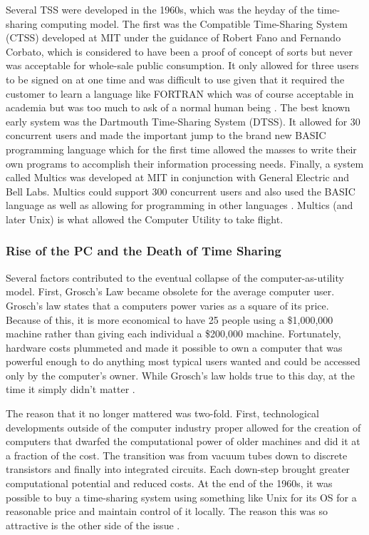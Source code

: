 \documentclass[12pt,oneside,letterpaper,titlepage]{article}
\begin{document}
Several TSS were developed in the 1960s, which was the heyday of the
time-sharing computing model.  The first was the Compatible Time-Sharing System
(CTSS) developed at MIT under the guidance of Robert Fano and Fernando Corbato,
which is considered to have been a proof of concept of sorts but never was
acceptable for whole-sale public consumption.  It only allowed for three users
to be signed on at one time and was difficult to use given that it required the
customer to learn a language like FORTRAN which was of course acceptable in
academia but was too much to ask of a normal human being \citep{kelly2004}.
The best known early system was the Dartmouth Time-Sharing System (DTSS).  It
allowed for 30 concurrent users and made the important jump to the brand new
BASIC programming language which for the first time allowed the masses to write
their own programs to accomplish their information processing needs.  Finally, a
system called Multics was developed at MIT in conjunction with General Electric
and Bell Labs.  Multics could support 300 concurrent users and also used the
BASIC language as well as allowing for programming in other languages
\citep{levy1994}.  Multics (and later Unix) is what allowed the Computer Utility
to take flight.

\subsubsection{Rise of the PC and the Death of Time Sharing}

Several factors contributed to the eventual collapse of the computer-as-utility
model.  First, Grosch's Law became obsolete for the average computer user.
Grosch's law states that a computers power varies as a square of its price.
Because of this, it is more economical to have 25 people using a \$1,000,000
machine rather than giving each individual a \$200,000 machine.  Fortunately,
hardware costs plummeted and made it possible to own a computer that was
powerful enough to do anything most typical users wanted and could be accessed
only by the computer's owner.  While Grosch's law holds true to this day, at the
time it simply didn't matter \citep{kelly2004}.

The reason that it no longer mattered was two-fold.  First, technological
developments outside of the computer industry proper allowed for the creation of
computers that dwarfed the computational power of older machines and did it at a
fraction of the cost.  The transition was from vacuum tubes down to discrete
transistors and finally into integrated circuits.  Each down-step brought
greater computational potential and reduced costs.  At the end of the 1960s, it
was possible to buy a time-sharing system using something like Unix for its OS
for a reasonable price and maintain control of it locally.  The reason this was
so attractive is the other side of the issue \citep{kelly2004}.
\end{document}
